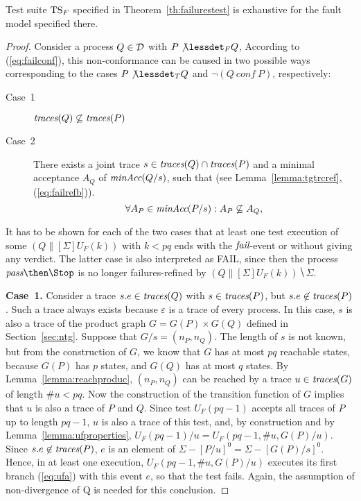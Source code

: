 %
\begin{lemma}\label{lemma:mainfexhaustive}
Test suite ${\text{TS}}_F$ specified in Theorem~\ref{th:failurestest} is exhaustive
for the fault model specified there.
\end{lemma}
\begin{proof}
Consider a process $Q\in{\cal D}$ with $P\not\lessdet_F Q$, According to
(\ref{eq:failconf}), this non-conformance can be caused in two possible ways
corresponding to the cases $P\not\lessdet_T Q$ and $\neg(Q\ conf\ P)$,
respectively:
\begin{description}
\item[Case~1] $\text{\it traces}(Q)\not\subseteq \text{\it traces}(P)$
\item[Case~2] There exists a joint trace $s\in\text{\it traces}(Q)\cap\text{\it traces}(P)$ and a minimal acceptance $A_Q$
of $\text{\it minAcc}(Q/s)$, such that
(see Lemma~\ref{lemma:tgtrcref}, (\ref{eq:failrefb})).
\begin{equation}
\label{eq:accsnotcontained}
\forall A_P\in\text{\it minAcc}(P/s): A_P\not\subseteq A_Q,
\end{equation}
\end{description}
It has to be shown for each of the two cases that at least one test
execution of some $(Q\parallel[\Sigma] U_F(k))$ with $k < pq$ ends with the
   ${\text{\it fail}}$-event or without giving any verdict. The latter case is also
interpreted  as FAIL, since then the process $\epass\then\Stop$ is no longer
failures-refined by $(Q\parallel[\Sigma] U_F(k))\hide \Sigma$.

\medskip
\noindent
{\bf Case~1.} Consider a  trace $s.e\in\text{\it traces}(Q)$ with $s\in\text{\it traces}(P)$, but
$s.e\not\in\text{\it traces}(P)$. Such a trace always exists because $\varepsilon$ is a
trace of every process. In this case, $s$ is also a trace of the product
graph $G = G(P)\times G(Q)$ defined in Section~\ref{sec:ntg}. Suppose that
$G/s = (n_P,n_Q)$. The length of $s$ is not known, but from the construction
of $G$,  we know that $G$ has at most $pq$ reachable states, because $G(P)$
has $p$ states, and $G(Q)$ has at most $q$ states. By
Lemma~\ref{lemma:reachproduc}, $(n_P,n_Q)$ can be reached by a trace
$u\in\text{\it traces}(G)$ of length $\#u < pq$. Now the construction of the transition
function of $G$ implies that $u$ is also a trace of $P$ and $Q$. Since test
$U_F(pq-1)$ accepts all traces of $P$ up to length $pq-1$, $u$ is also a
trace of this test, and, by construction and by Lemma~\ref{lemma:ufproperties}, 
$U_F(pq-1)/u = U_F(pq-1,\#u,G(P)/u)$. Since
$s.e\not\in\text{\it traces}(P)$, $e$ is an element of $\Sigma-[P/u]^0 = \Sigma - [G(P)/s]^0$. 
Hence, in at least
one execution, $U_F(pq-1,\#u,G(P)/u)$ executes its first branch (\ref{eq:ufa}) with
this event $e$, so that the test fails. Again, the
assumption of non-divergence of Q is needed for this conclusion.  


\end{proof}
